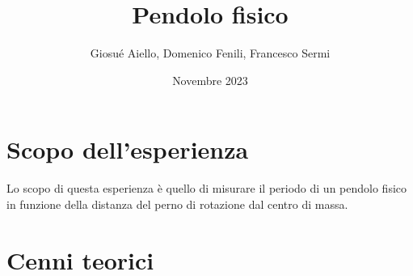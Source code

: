 \documentclass{article}
\title{\Huge{Pendolo fisico}}
\author{\large{Giosué Aiello, Domenico Fenili, Francesco Sermi}}
\date{Novembre 2023}
\begin{document}
	\begin{titlingpage}
		\maketitle
	\end{titlingpage}
\pagebreak
\tableofcontents
\pagebreak

\section{Scopo dell'esperienza}
Lo scopo di questa esperienza è quello di misurare il periodo di un pendolo fisico in funzione della distanza del perno di rotazione dal centro di massa.

\section{Cenni teorici}
\end{document}
